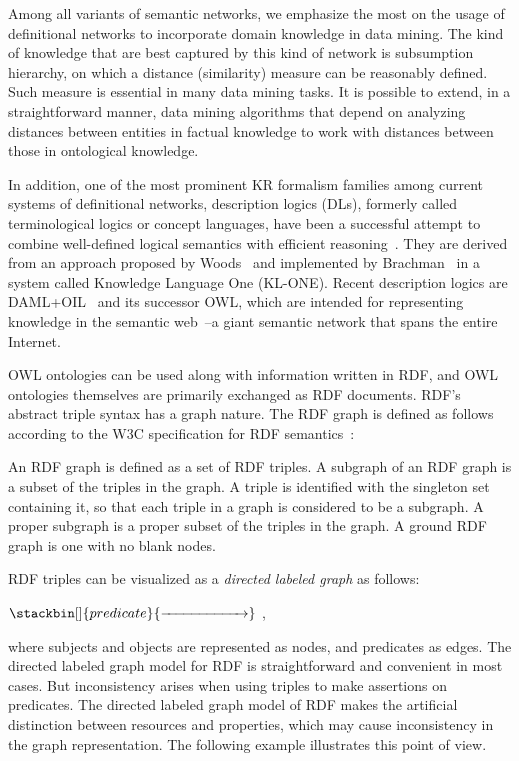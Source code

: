 Among all variants of semantic networks, we emphasize the most on the usage of definitional networks to incorporate domain knowledge in data mining. The kind of knowledge that are best captured by this kind of network is subsumption hierarchy, on which a distance (similarity) measure can be reasonably defined. Such measure is essential in many data mining tasks. It is possible to extend, in a straightforward manner, data mining algorithms that depend on analyzing distances between entities in factual knowledge to work with distances between those in ontological knowledge.

In addition, one of the most prominent KR formalism families among current systems of definitional networks, description logics (DLs), formerly called terminological logics or concept languages, have been a successful attempt to combine well-defined logical semantics with efficient reasoning~\cite{Sowa91principlesof}. They are derived from an approach proposed by Woods~\cite{woods75link} and implemented by Brachman~\cite{Brachman91livingwith} in a system called Knowledge Language One (KL-ONE). Recent description logics are DAML+OIL~\cite{Horrocks02daml+oil} and its successor OWL, which are intended for representing knowledge in the semantic web~\cite{Berners-Lee01}--a giant semantic network that spans the entire Internet.

OWL ontologies can be used along with information written in RDF, and OWL ontologies themselves are primarily exchanged as RDF documents. RDF's abstract triple syntax has a graph nature. The RDF graph is defined as follows according to the W3C specification for RDF semantics~\cite{Hayes_rdf2004}:

\begin{mydef}
An RDF graph is defined as a set of RDF triples. A subgraph of an RDF graph is a subset of the triples in the graph. A triple is identified with the singleton set containing it, so that each triple in a graph is considered to be a subgraph. A proper subgraph is a proper subset of the triples in the graph. A ground RDF graph is one with no blank nodes.
\end{mydef}

RDF triples can be visualized as a \emph{directed labeled graph} as follows:
\begin{center} $\stackbin[]{predicate}{\xrightarrow{\hspace*{2cm}}}$ \;,\end{center}
where subjects and objects are represented as nodes, and predicates as edges. The directed labeled graph model for RDF is straightforward and convenient in most cases. But inconsistency arises when using triples to make assertions on predicates. The directed labeled graph model of RDF makes the artificial distinction between resources and properties, which may cause inconsistency in the graph representation. The following example illustrates this point of view.

